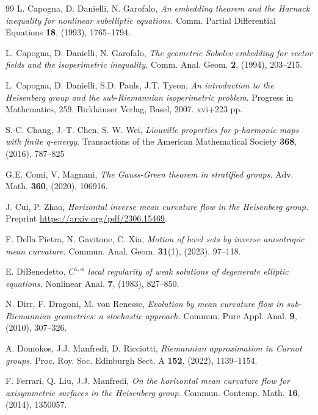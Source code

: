 \documentclass[10pt]{amsart}
\numberwithin{equation}{section}
\theoremstyle{definition}
\begin{document}
\begin{thebibliography}{99}
{\sc  L. Capogna, D. Danielli, N. Garofalo}, 
{\em An embedding theorem and the Harnack inequality for nonlinear subelliptic equations.} 
Comm. Partial Differential Equations {\bf 18}, (1993), 1765--1794.

{\sc  L. Capogna, D. Danielli, N. Garofalo}, 
{\em The geometric Sobolev embedding for vector fields and the isoperimetric inequality.} 
Comm. Anal. Geom. {\bf 2}, (1994), 203--215.

{\sc L. Capogna, D. Danielli, S.D. Pauls, J.T. Tyson},
{\em An introduction to the Heisenberg group and the sub-Riemannian isoperimetric problem}.
Progress in Mathematics, 259. Birkh\"{a}user Verlag, Basel, 2007. xvi+223 pp.

{\sc S.-C. Chang, J.-T. Chen, S. W. Wei},
{\em Liouville properties for p-harmonic maps with finite q-energy}.
Transactions of the American Mathematical Society
{\bf  368}, (2016), 787--825

{\sc G.E. Comi, V. Magnani},
{\em The Gauss-Green theorem in stratified groups.}
Adv. Math. {\bf 360}, (2020), 106916.

{\sc J. Cui, P. Zhao},
{\em  Horizontal inverse mean curvature flow in the Heisenberg group.} Preprint \url{https://arxiv.org/pdf/2306.15469}.

{\sc F. Della Pietra, N. Gavitone, C. Xia}, 
{\em Motion of level sets by inverse anisotropic mean curvature.} Commun. Anal. Geom. {\bf 31}(1), (2023), 97--118.


{\sc E. DiBenedetto}, {\em $C^{1,\alpha}$ local regularity of weak solutions of degenerate elliptic equations.} 
Nonlinear Anal. {\bf 7}, (1983), 827--850.

 {\sc N. Dirr, F.  Dragoni, M. von Renesse},
 {\em Evolution by mean curvature flow in sub-Riemannian geometries: a stochastic approach.}
 Commun. Pure Appl. Anal. {\bf 9}, (2010), 307--326. 

{\sc A. Domokos, J.J. Manfredi, D. Ricciotti},
{\em Riemannian approximation in Carnot groups.}
Proc. Roy. Soc. Edinburgh Sect. A {\bf 152}, (2022), 1139--1154.

{\sc F. Ferrari, Q. Liu, J.J. Manfredi}, 
{\em On the horizontal mean curvature flow for axisymmetric surfaces in the Heisenberg group.} 
Commun. Contemp. Math. {\bf 16}, (2014), 1350057.



\end{thebibliography}
\end{document}
